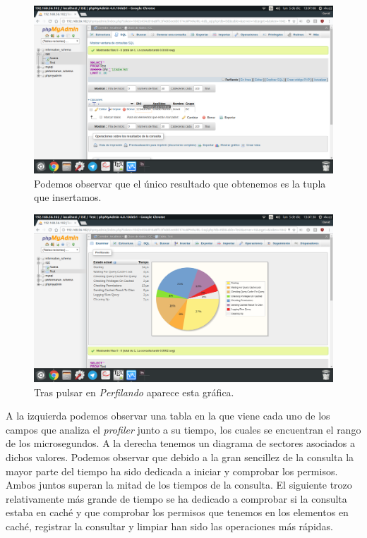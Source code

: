 \begin{figure}[H]
	\centering
	\includegraphics[scale=0.3]{mysqlResult.png}
	\caption{Podemos observar que el único resultado que obtenemos es la tupla que insertamos.}
\end{figure}

\begin{figure}[H]
	\centering
	\includegraphics[scale=0.3]{mysqlProfile.png}
	\caption{Tras pulsar en \textit{Perfilando} aparece esta gráfica.}
\end{figure}

A la izquierda podemos observar una tabla en la que viene cada uno de los campos que analiza el \textit{profiler} junto a su tiempo, los cuales se encuentran el rango de los microsegundos. A la derecha tenemos un diagrama de sectores asociados a dichos valores. Podemos observar que debido a la gran sencillez de la consulta la mayor parte del tiempo ha sido dedicada a iniciar y comprobar los permisos. Ambos juntos superan la mitad de los tiempos de la consulta. El siguiente trozo relativamente más grande de tiempo se ha dedicado a comprobar si la consulta estaba en caché y que comprobar los permisos que tenemos en los elementos en caché, registrar la consultar y limpiar han sido las operaciones más rápidas.



